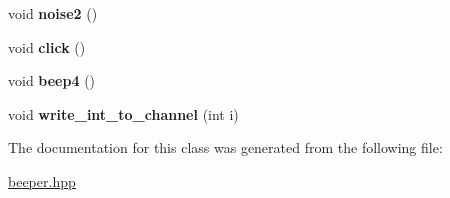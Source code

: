 \begin{DoxyCompactItemize}
void {\bfseries noise2} ()
\item 
\mbox{\label{classNEC_1_1Beeper_a6feccd1cab83c847c9bd090f3e0c772a}} 
void {\bfseries click} ()
\item 
\mbox{\label{classNEC_1_1Beeper_a41a990ecf398ae6c4fa0da5779b73ff2}} 
void {\bfseries beep4} ()
\item 
\mbox{\label{classNEC_1_1Beeper_a31ae481fbb5c9bc598daae767cc4dcdb}} 
void {\bfseries write\+\_\+int\+\_\+to\+\_\+channel} (int i)
\end{DoxyCompactItemize}


The documentation for this class was generated from the following file\+:\begin{DoxyCompactItemize}
\item 
\hyperlink{beeper_8hpp}{beeper.\+hpp}\end{DoxyCompactItemize}
